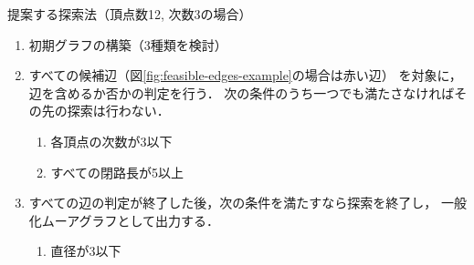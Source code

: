 \begin{frame}{提案する探索法（頂点数12, 次数3の場合）}
\begin{enumerate}
\item 初期グラフの構築（3種類を検討）
\item すべての候補辺（図\ref{fig:feasible-edges-example}の場合は赤い辺）
  を対象に，辺を含めるか否かの判定を行う．
  次の条件のうち一つでも満たさなければその先の探索は行わない．
\begin{enumerate}
\item 各頂点の次数が3以下
\item すべての閉路長が5以上
\end{enumerate}
\item すべての辺の判定が終了した後，次の条件を満たすなら探索を終了し，
  一般化ムーアグラフとして出力する．
  \begin{enumerate}
    \item 直径が3以下
  \end{enumerate}
\end{enumerate}
\begin{columns}[b]
\begin{column}{.32\textwidth}
\centering
      \def\svgwidth{\textwidth}
      
      \label{fig:feasible-edges-example}
\end{column}
\begin{column}{.32\textwidth}
\centering
        \def\svgwidth{\textwidth}
        
        \label{fig:initial-graph-cycle}
\end{column}
\begin{column}{.32\textwidth}
\centering
        \def\svgwidth{\textwidth}
        
        \label{fig:initial-graph-stree}
\end{column}
\end{columns}
\end{frame}

